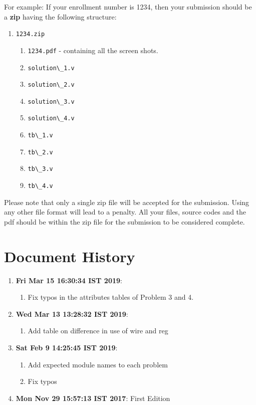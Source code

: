 \documentclass[a4paper,10pt]{article}
\theoremstyle{mytheor}
\newcommand{\inlinev}[1]{\lstinline[style=verilog-inline-style]{#1}}
\newcommand{\histitem}[2]{
  \footnotesize
  \item \textbf{#1}: #2
  \normalsize
}
\begin{document}
{\color{blue}For example}: If your enrollment number is 1234, then your
submission should be a \textbf{\color{blue}zip} having the following
structure:

\begin{enumerate}
\item \inlinev{1234.zip}
  \begin{enumerate}
  \item \inlinev{1234.pdf} - containing
    all the screen shots.
  \item \inlinev{solution\_1.v}
  \item \inlinev{solution\_2.v}
  \item \inlinev{solution\_3.v}
  \item \inlinev{solution\_4.v}
  \item \inlinev{tb\_1.v}
  \item \inlinev{tb\_2.v}
  \item \inlinev{tb\_3.v}
  \item \inlinev{tb\_4.v}
  \end{enumerate}
\end{enumerate}

Please note that only a single zip file will be accepted for the
submission. Using any other file format will lead to a
{\color{red}penalty}. All your files, source codes and the pdf should
be within the zip file for the submission to be considered complete.

\section*{Document History}
\begin{enumerate}
  \histitem{Fri Mar 15 16:30:34 IST 2019}{
    \begin{enumerate}
    \item Fix typos in the attributes tables of Problem 3 and 4.
    \end{enumerate}
  }
  \histitem{Wed Mar 13 13:28:32 IST 2019}{
    \begin{enumerate}
    \item Add table on difference in use of wire and reg
    \end{enumerate}
  }
  \histitem{Sat Feb  9 14:25:45 IST 2019}{
    \begin{enumerate}
    \item Add expected module names to each problem
    \item Fix typos
    \end{enumerate}
  }
  \histitem{Mon Nov 29 15:57:13 IST 2017} {
    First Edition
  }
\end{enumerate}
\end{document}
